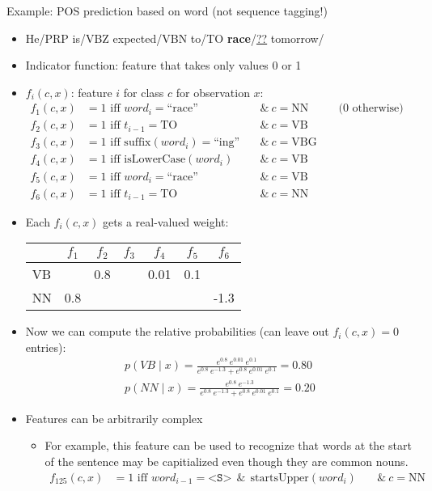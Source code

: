 \documentclass[11pt,letterpaper]{article}
\begin{document}
Example: POS prediction based on word (not sequence tagging!)

\begin{itemize}
  \item He/PRP is/VBZ expected/VBN to/TO \textbf{race}/\underline{??} tomorrow/
  \item Indicator function: feature that takes only values 0 or 1
  \item $f_i(c,x)$: feature $i$ for class $c$ for observation $x$:
    \begin{align*} 
      f_1(c,x) &= 1 \text{ iff } \textit{word}_i = \text{``race''} ~&&\&~ c=\text{NN} \text{~~~~~~~~(0 otherwise})&&&&&&&&\\
      f_2(c,x) &= 1 \text{ iff } t_{i-1} = \text{TO}               ~&&\&~ c=\text{VB} \\
      f_3(c,x) &= 1 \text{ iff } \text{suffix}(\textit{word}_i) = \text{``ing''} ~&&\&~ c=\text{VBG} \\
      f_4(c,x) &= 1 \text{ iff } \text{isLowerCase}(\textit{word}_i) ~&&\&~ c=\text{VB} \\
      f_5(c,x) &= 1 \text{ iff } \textit{word}_i = \text{``race''}   ~&&\&~ c=\text{VB} \\
      f_6(c,x) &= 1 \text{ iff } t_{i-1} = \text{TO}                 ~&&\&~ c=\text{NN}
    \end{align*}
  \item Each $f_i(c,x)$ gets a real-valued weight: ~~~
    \begin{tabular}{ lcccccc }
      \hline
         & $f_1$ & $f_2$ & $f_3$ & $f_4$ & $f_5$ & $f_6$ \\
      \hline
      VB &       &  0.8  &       &  0.01 &  0.1  &       \\
      NN &  0.8  &       &       &       &       &  -1.3 \\
      \hline
    \end{tabular}
  \item Now we can compute the relative probabilities (can leave out $f_i(c,x)=0$ entries):
    \begin{align*} 
      p(VB \mid x) = \frac{e^{0.8}~e^{0.01}~e^{0.1}}
                          {e^{0.8}~e^{-1.3} + e^{0.8}~e^{0.01}~e^{0.1}} = 0.80\\
      p(NN \mid x) = \frac{e^{0.8}~e^{-1.3}}
                          {e^{0.8}~e^{-1.3} + e^{0.8}~e^{0.01}~e^{0.1}} = 0.20
    \end{align*}
  \item Features can be arbitrarily complex
    \begin{itemize}
      \item For example, this feature can be used to recognize that words at the start of the sentence may be capitialized even though they are common nouns.
        \begin{align*} 
          f_{125}(c,x) &= 1 \text{ iff } \textit{word}_{i-1} = \texttt{<S>} ~~\&~~ \text{startsUpper}(\textit{word}_i) ~&&\&~ c=\text{NN}&&&&&&&& \\
        \end{align*}
    \end{itemize}
\end{itemize}
\end{document}
